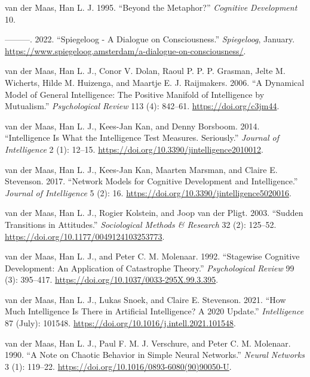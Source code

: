 \documentclass[
  a4paper,
  DIV=11,
  numbers=noendperiod,
  oneside]{scrreprt}
\newlength{\cslhangindent}
\newenvironment{CSLReferences}[2] %
 {\begin{list}{}{%
  \setlength{\itemindent}{0pt}
  \setlength{\leftmargin}{0pt}
  \setlength{\parsep}{0pt}
  \ifodd #1
   \setlength{\leftmargin}{\cslhangindent}
   \setlength{\itemindent}{-1\cslhangindent}
  \fi
  \setlength{\itemsep}{#2\baselineskip}}}
 {\end{list}}
\begin{document}
\begin{CSLReferences}{1}{0}
van der Maas, Han L. J. 1995. {``Beyond the Metaphor?''} \emph{Cognitive
Development} 10.

---------. 2022. {``Spiegeloog - A Dialogue on Consciousness.''}
\emph{Spiegeloog}, January.
\url{https://www.spiegeloog.amsterdam/a-dialogue-on-consciousness/}.

van der Maas, Han L. J., Conor V. Dolan, Raoul P. P. P. Grasman, Jelte
M. Wicherts, Hilde M. Huizenga, and Maartje E. J. Raijmakers. 2006. {``A
Dynamical Model of General Intelligence: {The} Positive Manifold of
Intelligence by Mutualism.''} \emph{Psychological Review} 113 (4):
842--61. \url{https://doi.org/c3jm44}.

van der Maas, Han L. J., Kees-Jan Kan, and Denny Borsboom. 2014.
{``Intelligence Is What the Intelligence Test Measures. Seriously.''}
\emph{Journal of Intelligence} 2 (1): 12--15.
\url{https://doi.org/10.3390/jintelligence2010012}.

van der Maas, Han L. J., Kees-Jan Kan, Maarten Marsman, and Claire E.
Stevenson. 2017. {``Network {Models} for {Cognitive Development} and
{Intelligence}.''} \emph{Journal of Intelligence} 5 (2): 16.
\url{https://doi.org/10.3390/jintelligence5020016}.

van der Maas, Han L. J., Rogier Kolstein, and Joop van der Pligt. 2003.
{``Sudden {Transitions} in {Attitudes}.''} \emph{Sociological Methods \&
Research} 32 (2): 125--52.
\url{https://doi.org/10.1177/0049124103253773}.

van der Maas, Han L. J., and Peter C. M. Molenaar. 1992. {``Stagewise
Cognitive Development: An Application of Catastrophe Theory.''}
\emph{Psychological Review} 99 (3): 395--417.
\url{https://doi.org/10.1037/0033-295X.99.3.395}.

van der Maas, Han L. J., Lukas Snoek, and Claire E. Stevenson. 2021.
{``How Much Intelligence Is There in Artificial Intelligence? {A} 2020
Update.''} \emph{Intelligence} 87 (July): 101548.
\url{https://doi.org/10.1016/j.intell.2021.101548}.

van der Maas, Han L. J., Paul F. M. J. Verschure, and Peter C. M.
Molenaar. 1990. {``A Note on Chaotic Behavior in Simple Neural
Networks.''} \emph{Neural Networks} 3 (1): 119--22.
\url{https://doi.org/10.1016/0893-6080(90)90050-U}.


\end{CSLReferences}
\end{document}
